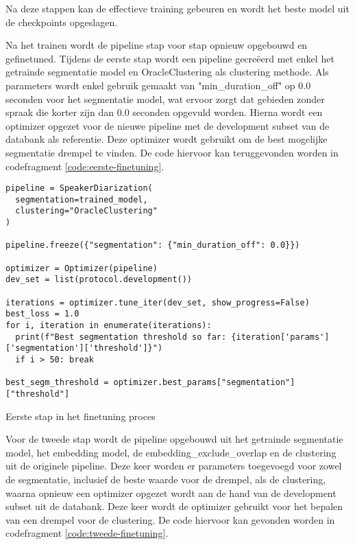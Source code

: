 Na deze stappen kan de effectieve training gebeuren en wordt het beste model uit de checkpoints opgeslagen.

Na het trainen wordt de pipeline stap voor stap opnieuw opgebouwd en gefinetuned. Tijdens de eerste stap wordt een pipeline gecreëerd met enkel het getrainde segmentatie model en OracleClustering als clustering methode. Als parameters wordt enkel gebruik gemaakt van "min\_duration\_off" op 0.0 seconden voor het segmentatie model, wat ervoor zorgt dat gebieden zonder spraak die korter zijn dan 0.0 seconden opgevuld worden. Hierna wordt een optimizer opgezet voor de nieuwe pipeline met de development subset van de databank als referentie. Deze optimizer wordt gebruikt om de best mogelijke segmentatie drempel te vinden. De code hiervoor kan teruggevonden worden in codefragment \ref{code:eerste-finetuning}.

\begin{listing}
	\begin{verbatim}
pipeline = SpeakerDiarization(
  segmentation=trained_model,
  clustering="OracleClustering"
)

pipeline.freeze({"segmentation": {"min_duration_off": 0.0}})

optimizer = Optimizer(pipeline)
dev_set = list(protocol.development())

iterations = optimizer.tune_iter(dev_set, show_progress=False)
best_loss = 1.0
for i, iteration in enumerate(iterations):
  print(f"Best segmentation threshold so far: {iteration['params']['segmentation']['threshold']}")
  if i > 50: break
  
best_segm_threshold = optimizer.best_params["segmentation"]["threshold"]
	\end{verbatim}
	\caption[Set-up voor eerste finetuning]{\label{code:eerste-finetuning}Eerste stap in het finetuning proces}
\end{listing}

Voor de tweede stap wordt de pipeline opgebouwd uit het getrainde segmentatie model, het embedding model, de embedding\_exclude\_overlap en de clustering uit de originele pipeline. Deze keer worden er parameters toegevoegd voor zowel de segmentatie, inclusief de beste waarde voor de drempel, als de clustering, waarna opnieuw een optimizer opgezet wordt aan de hand van de development subset uit de databank. Deze keer wordt de optimizer gebruikt voor het bepalen van een drempel voor de clustering. De code hiervoor kan gevonden worden in codefragment \ref{code:tweede-finetuning}.

